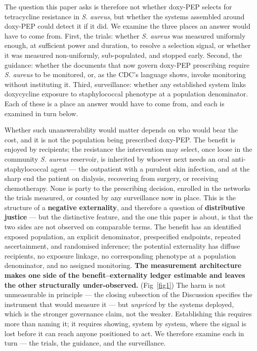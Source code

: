 \documentclass[10pt,letterpaper]{article}
\begin{document}
The question this paper asks is therefore not whether doxy-PEP selects
for tetracycline resistance in \emph{S. aureus}, but whether the systems
assembled around doxy-PEP could detect it if it did. We examine the
three places an answer would have to come from. First, the trials:
whether \emph{S. aureus} was measured uniformly enough, at sufficient
power and duration, to resolve a selection signal, or whether it was
measured non-uniformly, sub-populated, and stopped early. Second, the
guidance: whether the documents that now govern doxy-PEP prescribing
require \emph{S. aureus} to be monitored, or, as the CDC's language
shows, invoke monitoring without instituting it. Third, surveillance:
whether any established system links doxycycline exposure to
staphylococcal phenotype at a population denominator. Each of these is a
place an answer would have to come from, and each is examined in turn
below.

Whether such unanswerability would matter depends on who would bear the
cost, and it is not the population being prescribed doxy-PEP. The
benefit is enjoyed by recipients; the resistance the intervention may
select, once loose in the community \emph{S. aureus} reservoir, is
inherited by whoever next needs an oral anti-staphylococcal agent ---
the outpatient with a purulent skin infection, and at the sharp end the
patient on dialysis, recovering from surgery, or receiving chemotherapy.
None is party to the prescribing decision, enrolled in the networks the
trials measured, or counted by any surveillance now in place. This is
the structure of a \textbf{negative externality}, and therefore a
question of \textbf{distributive justice} --- but the distinctive
feature, and the one this paper is about, is that the two sides are not
observed on comparable terms. The benefit has an identified exposed
population, an explicit denominator, prespecified endpoints, repeated
ascertainment, and randomised inference; the potential externality has
diffuse recipients, no exposure linkage, no corresponding phenotype at a
population denominator, and no assigned monitoring. \textbf{The
measurement architecture makes one side of the benefit--externality
ledger estimable and leaves the other structurally under-observed.} (Fig~\ref{fig1}) The
harm is not unmeasurable in principle --- the closing subsection of the
Discussion specifies the instrument that would measure it --- but
\emph{unpriced} by the systems deployed, which is the stronger
governance claim, not the weaker. Establishing this requires more than
naming it; it requires showing, system by system, where the signal is
lost before it can reach anyone positioned to act. We therefore examine
each in turn --- the trials, the guidance, and the surveillance.
\end{document}

